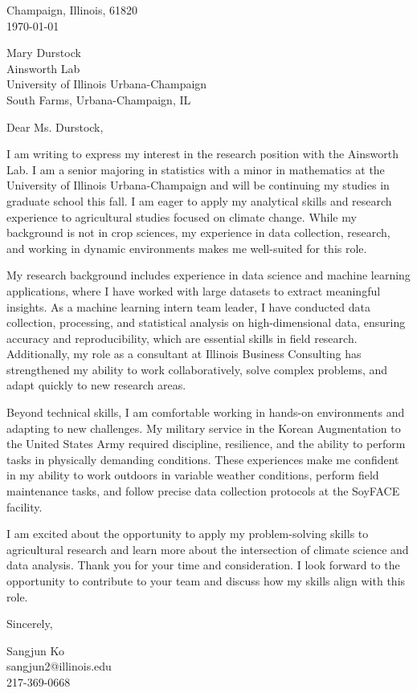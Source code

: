 \documentclass[11pt]{article}
\begin{document}
\noindent
Champaign, Illinois, 61820 \\
\today
\vspace{2em}

\noindent
Mary Durstock \\
Ainsworth Lab \\
University of Illinois Urbana-Champaign \\
South Farms, Urbana-Champaign, IL \\

\vspace{1.5em}

Dear Ms. Durstock,


I am writing to express my interest in the research position with the Ainsworth Lab. I am a senior majoring in statistics with a minor in mathematics at the University of Illinois Urbana-Champaign and will be continuing my studies in graduate school this fall. I am eager to apply my analytical skills and research experience to agricultural studies focused on climate change. While my background is not in crop sciences, my experience in data collection, research, and working in dynamic environments makes me well-suited for this role.

My research background includes experience in data science and machine learning applications, where I have worked with large datasets to extract meaningful insights. As a machine learning intern team leader, I have conducted data collection, processing, and statistical analysis on high-dimensional data, ensuring accuracy and reproducibility, which are essential skills in field research. Additionally, my role as a consultant at Illinois Business Consulting has strengthened my ability to work collaboratively, solve complex problems, and adapt quickly to new research areas.

Beyond technical skills, I am comfortable working in hands-on environments and adapting to new challenges. My military service in the Korean Augmentation to the United States Army required discipline, resilience, and the ability to perform tasks in physically demanding conditions. These experiences make me confident in my ability to work outdoors in variable weather conditions, perform field maintenance tasks, and follow precise data collection protocols at the SoyFACE facility.

I am excited about the opportunity to apply my problem-solving skills to agricultural research and learn more about the intersection of climate science and data analysis. Thank you for your time and consideration. I look forward to the opportunity to contribute to your team and discuss how my skills align with this role.

\vspace{1em}

Sincerely,

\vspace{2em}

\noindent
Sangjun Ko\\
sangjun2@illinois.edu\\
217-369-0668
\end{document}
